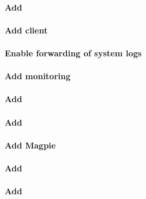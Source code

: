 \documentclass[letterpaper]{article}
\begin{document}
\clearpage
\paragraph{Add \beegfs{}} \label{sec:add_beegfs}


\vspace*{.6cm}
\paragraph{Add \Lustre{} client} \label{sec:lustre_client}




\paragraph{Enable forwarding of system logs} \label{sec:add_syslog}


\paragraph{Add \Nagios{} monitoring} \label{sec:add_nagios}


\clearpage
\paragraph{Add \clustershell{}}


\paragraph{Add \genders{}}


\paragraph{Add Magpie}


\paragraph{Add \conman{}} \label{sec:add_conman}


\vspace*{.25cm}
\paragraph{Add \nhc{}} \label{sec:add_nhc}

\end{document}
